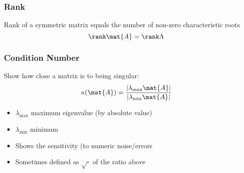 \documentclass[mathserif, xcolor=table, svgnames]{beamer}
\begin{document}
\begin{frame}
  \frametitle{Rank}
  \begin{theorem}
    Rank of a symmetric matrix equals the number of non-zero
    characteristic roots
    \begin{equation*}
      \rank \mat{A} = \rank \Lambda
    \end{equation*}
  \end{theorem}
\end{frame}

\begin{frame}
  \frametitle{Condition Number}
  Show how close a matrix is to being singular:
  \begin{equation*}
    \kappa(\mat{A})
    =
    \frac{|\lambda_{\max} \mat{A}|}{|\lambda_{\min} \mat{A}|}
  \end{equation*}
  \begin{itemize}
  \item $\lambda_{\max}$ maximum eigenvalue (by absolute value)
  \item $\lambda_{\min}$ minimum
  \item Shows the sensitivity (to numeric noise/errors
  \item Sometimes defined as $\sqrt{\cdot}$ of the ratio above
  \end{itemize}
\end{frame}
\end{document}
